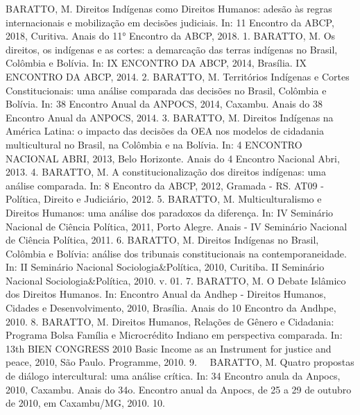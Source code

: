 \begin{cvhonors}
  \cvhonor
    {BARATTO, M.}
    {Direitos Indígenas como Direitos Humanos: adesão às regras internacionais e mobilização em decisões judiciais. In: 11 Encontro da ABCP, 2018, Curitiva. Anais do 11° Encontro da ABCP, 2018.}
    {}
    {1. }
  \cvhonor
    {BARATTO, M.}
    {Os direitos, os indígenas e as cortes: a demarcação das terras indígenas no Brasil, Colômbia e Bolívia. In: IX ENCONTRO DA ABCP, 2014, Brasília. IX ENCONTRO DA ABCP, 2014.}
    {}
    {2. }
  \cvhonor
    {BARATTO, M.}
    {Territórios Indígenas e Cortes Constitucionais: uma análise comparada das decisões no Brasil, Colômbia e Bolívia. In: 38 Encontro Anual da ANPOCS, 2014, Caxambu. Anais do 38 Encontro Anual da ANPOCS, 2014.}
    {}
    {3. }
  \cvhonor
    {BARATTO, M.}
    {Direitos Indígenas na América Latina: o impacto das decisões da OEA nos modelos de cidadania multicultural no Brasil, na Colômbia e na Bolívia. In: 4 ENCONTRO NACIONAL ABRI, 2013, Belo Horizonte. Anais do 4 Encontro Nacional Abri, 2013.}
    {}
    {4. }
  \cvhonor
    {BARATTO, M.}
    {A constitucionalização dos direitos indígenas: uma análise comparada. In: 8 Encontro da ABCP, 2012, Gramada - RS. AT09 - Política, Direito e Judiciário, 2012.}
    {}
    {5. }
  \cvhonor
    {BARATTO, M.}
    {Multiculturalismo e Direitos Humanos: uma análise dos paradoxos da diferença. In: IV Seminário Nacional de Ciência Política, 2011, Porto Alegre. Anais - IV Seminário Nacional de Ciência Política, 2011.}
    {}
    {6. }
  \cvhonor
    {BARATTO, M.}
    {Direitos Indígenas no Brasil, Colômbia e Bolívia: análise dos tribunais constitucionais na contemporaneidade. In: II Seminário Nacional Sociologia\&Política, 2010, Curitiba. II Seminário Nacional Sociologia\&Política, 2010. v. 01.}
    {}
    {7. }
  \cvhonor
    {BARATTO, M.}
    {O Debate Islâmico dos Direitos Humanos. In: Encontro Anual da Andhep - Direitos Humanos, Cidades e Desenvolvimento, 2010, Brasília. Anais do 10 Encontro da Andhpe, 2010.}
    {}
    {8. }
  \cvhonor
    {BARATTO, M.}
    {Direitos Humanos, Relações de Gênero e Cidadania: Programa Bolsa Família e Microcrédito Indiano em perspectiva comparada. In: 13th BIEN CONGRESS 2010 Basic Income as an Instrument for justice and peace, 2010, São Paulo. Programme, 2010.}
    {}
    {9. }
  \cvhonor
    {\faStar~~BARATTO, M.}
    {Quatro propostas de diálogo intercultural: uma análise crítica. In: 34 Encontro anula da Anpocs, 2010, Caxambu. Anais do 34o. Encontro anual da Anpocs, de 25 a 29 de outubro de 2010, em Caxambu/MG, 2010.}
    {}
    {10. }
  \cvhonor

\end{cvhonors}
